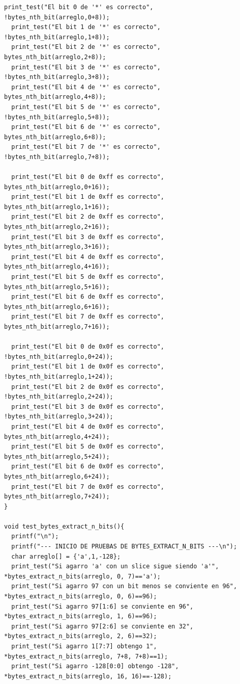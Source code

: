 \documentclass[11pt]{article}
\begin{document}
\begin{lstlisting}[style=Cstyle]
  print_test("El bit 0 de '*' es correcto", !bytes_nth_bit(arreglo,0+8));
  print_test("El bit 1 de '*' es correcto", !bytes_nth_bit(arreglo,1+8));
  print_test("El bit 2 de '*' es correcto", bytes_nth_bit(arreglo,2+8));
  print_test("El bit 3 de '*' es correcto", !bytes_nth_bit(arreglo,3+8));
  print_test("El bit 4 de '*' es correcto", bytes_nth_bit(arreglo,4+8));
  print_test("El bit 5 de '*' es correcto", !bytes_nth_bit(arreglo,5+8));
  print_test("El bit 6 de '*' es correcto", bytes_nth_bit(arreglo,6+8));
  print_test("El bit 7 de '*' es correcto", !bytes_nth_bit(arreglo,7+8));

  print_test("El bit 0 de 0xff es correcto", bytes_nth_bit(arreglo,0+16));
  print_test("El bit 1 de 0xff es correcto", bytes_nth_bit(arreglo,1+16));
  print_test("El bit 2 de 0xff es correcto", bytes_nth_bit(arreglo,2+16));
  print_test("El bit 3 de 0xff es correcto", bytes_nth_bit(arreglo,3+16));
  print_test("El bit 4 de 0xff es correcto", bytes_nth_bit(arreglo,4+16));
  print_test("El bit 5 de 0xff es correcto", bytes_nth_bit(arreglo,5+16));
  print_test("El bit 6 de 0xff es correcto", bytes_nth_bit(arreglo,6+16));
  print_test("El bit 7 de 0xff es correcto", bytes_nth_bit(arreglo,7+16));

  print_test("El bit 0 de 0x0f es correcto", !bytes_nth_bit(arreglo,0+24));
  print_test("El bit 1 de 0x0f es correcto", !bytes_nth_bit(arreglo,1+24));
  print_test("El bit 2 de 0x0f es correcto", !bytes_nth_bit(arreglo,2+24));
  print_test("El bit 3 de 0x0f es correcto", !bytes_nth_bit(arreglo,3+24));
  print_test("El bit 4 de 0x0f es correcto", bytes_nth_bit(arreglo,4+24));
  print_test("El bit 5 de 0x0f es correcto", bytes_nth_bit(arreglo,5+24));
  print_test("El bit 6 de 0x0f es correcto", bytes_nth_bit(arreglo,6+24));
  print_test("El bit 7 de 0x0f es correcto", bytes_nth_bit(arreglo,7+24));
}

void test_bytes_extract_n_bits(){
  printf("\n");
  printf("--- INICIO DE PRUEBAS DE BYTES_EXTRACT_N_BITS ---\n");
  char arreglo[] = {'a',1,-128};
  print_test("Si agarro 'a' con un slice sigue siendo 'a'", *bytes_extract_n_bits(arreglo, 0, 7)=='a');
  print_test("Si agarro 97 con un bit menos se conviente en 96", *bytes_extract_n_bits(arreglo, 0, 6)==96);
  print_test("Si agarro 97[1:6] se conviente en 96", *bytes_extract_n_bits(arreglo, 1, 6)==96);
  print_test("Si agarro 97[2:6] se conviente en 32", *bytes_extract_n_bits(arreglo, 2, 6)==32);
  print_test("Si agarro 1[7:7] obtengo 1", *bytes_extract_n_bits(arreglo, 7+8, 7+8)==1);
  print_test("Si agarro -128[0:0] obtengo -128", *bytes_extract_n_bits(arreglo, 16, 16)==-128);


\end{lstlisting}
\end{document}
